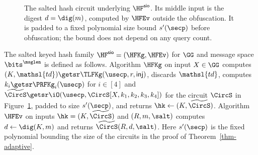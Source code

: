 \begin{figure}[t]
\begin{center}
\end{center}
\vspace{-6pt}
\caption{The salted hash circuit underlying $\HF^{\mathsf{sio}}$. Its middle input is the digest $d=\dig(m)$, computed by $\HFEv$ outside the obfuscation. It is padded to a fixed polynomial size bound $s'(\secp)$ before obfuscation; the bound does not depend on any query count.}\label{fig-circuit-salted}
\vspace{-3pt}\hrulefill
\vspace{-1ex}
\end{figure}

\begin{construction} \label{constr-sio}
The salted keyed hash family $\HF^{\mathsf{sio}} = (\HFKg, \HFEv)$ for $\GG$ and message space $\bits^{\msglen}$ is defined as follows. Algorithm $\HFKg$ on input $X \in \GG$ computes $(K,\mathsl{td}) \getsr \TLFKg(\usecp,r,\mathsf{inj})$, discards $\mathsl{td}$, computes $k_i \getsr \PRFKg_i(\usecp)$ for $i \in [4]$ and $\widetilde{\CircS} \getsr \iO(\usecp, \CircS[X, k_1, k_2, k_3, k_4])$ for the circuit $\CircS$ in Figure~\ref{fig-circuit-salted}, padded to size $s'(\secp)$, and returns $\hk \gets (K,\widetilde{\CircS})$. Algorithm $\HFEv$ on inputs $\hk = (K,\widetilde{\CircS})$ and $(R,m,\salt)$ computes $d \gets \dig(K,m)$ and returns $\widetilde{\CircS}(R, d, \salt)$. Here $s'(\secp)$ is the fixed polynomial bounding the size of the circuits in the proof of Theorem~\ref{thm-adaptive}.
\end{construction}

